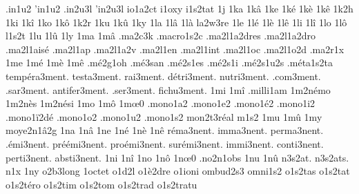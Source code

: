 {                    .in1u2
                    'in1u2
                    .in2u3l
                    'in2u3l
                    io1a2ct
                    i1oxy
                    i1s2tat
1j
1ka
1k\^a
1ke
1k\'e
1k\`e
1k\^e
1k2h
1ki
1k\^i
1ko
1k\^o
1k2r
1ku
1k\^u
1ky
1la
1l\^a
1l\`a
                    la2w3re
1le
1l\'e
1l\`e
1l\^e
1li
1l\^i
1lo
1l\^o
l1s2t
1lu
1l\^u
1ly
1ma
1m\^a
                    .ma2c3k
                    .macro1s2c
                    .ma2l1a2dres
                    .ma2l1a2dro
                    .ma2l1ais\'e
                    .ma2l1ap
                    .ma2l1a2v
                    .ma2l1en
                    .ma2l1int
                    .ma2l1oc
                    .ma2l1o2d
                    .ma2r1x %
1me
1m\'e
1m\`e
1m\^e
                    .m\'e2g1oh
                    .m\'e3san %
                    .m\'e2s1es
                    .m\'e2s1i
                    .m\'e2s1u2s
                    .m\'eta1s2ta
temp\'era3ment.
    testa3ment.
      rai3ment.
  d\'etri3ment.
    nutri3ment.
     .com3ment.
     .sar3ment.
  antifer3ment.
     .ser3ment.
    fichu3ment.
1mi
1m\^i
                    .milli1am
                    1m2n\'emo
                    1m2n\`es
                    1m2n\'esi
1mo
1m\^o
1m\oe0 %
                    .mono1a2
                    .mono1e2
                    .mono1\'e2
                    .mono1i2
                    .mono1\"i2d\'e
                    .mono1o2
                    .mono1u2
                    .mono1s2
                    mon2t3r\'eal %
m1s2
1mu
1m\^u
1my
                    moye2n1\^a2g
1na
1n\^a
1ne
1n\'e
1n\`e
1n\^e
    r\'ema3nent.
      imma3nent.
     perma3nent.
    .\'emi3nent.
pr\'e\'emi3nent.
  pro\'emi3nent.
  sur\'emi3nent.
      immi3nent.
     conti3nent.
     perti3nent.
     absti3nent.
1ni
1n\^i
1no
1n\^o
1n\oe0 %
                    .no2n1obs
1nu
1n\^u
                    n3s2at.
                    n3s2ats.
n1x
1ny
                    o2b3long
                    1octet %
                    o1d2l
                    o1\`e2dre
                    o1ioni
                    ombud2s3
                    omni1s2
                    o1s2tas
                    o1s2tat
                    o1s2t\'ero
                    o1s2tim
                    o1s2tom
                    o1s2trad
                    o1s2tratu
}
